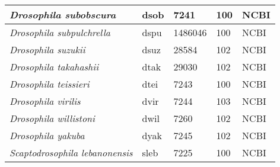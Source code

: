 \documentclass[10pt,letterpaper]{article}
\begin{document}
\begin{table}[h!]
\begin{tabular}{|l|l|l|l|l|}
\textit{Drosophila subobscura}         & dsob                & 7241              & 100              & NCBI            \\ \hline
\textit{Drosophila subpulchrella}      & dspu                & 1486046           & 100              & NCBI            \\ \hline
\textit{Drosophila suzukii}            & dsuz                & 28584             & 102              & NCBI            \\ \hline
\textit{Drosophila takahashii}         & dtak                & 29030             & 102              & NCBI            \\ \hline
\textit{Drosophila teissieri}          & dtei                & 7243              & 100              & NCBI            \\ \hline
\textit{Drosophila virilis}            & dvir                & 7244              & 103              & NCBI            \\ \hline
\textit{Drosophila willistoni}         & dwil                & 7260              & 102              & NCBI            \\ \hline
\textit{Drosophila yakuba}             & dyak                & 7245              & 102              & NCBI            \\ \hline
\textit{Scaptodrosophila lebanonensis} & sleb                & 7225              & 100              & NCBI            \\ \hline
\end{tabular}
\label{stable:genomes}
\end{table}
\end{document}
